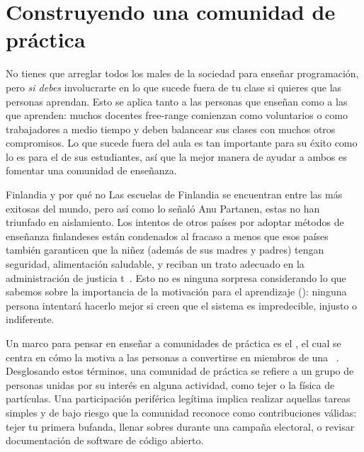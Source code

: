 \chapter{Construyendo una comunidad de práctica}\label{s:community}

No tienes que arreglar todos los males de la sociedad para enseñar programación,
pero \emph{si debes} involucrarte en
lo que sucede fuera de tu clase si quieres que las personas aprendan.
Esto se aplica tanto a las personas que enseñan como a las que aprenden:
muchos docentes free-range comienzan como voluntarios o como trabajadores a medio tiempo
y deben balancear  sus clases con muchos otros compromisos.
Lo que sucede fuera del aula es tan importante para su éxito
como lo es para el de sus estudiantes,
así que la mejor manera de ayudar a ambos es fomentar una comunidad de enseñanza.


\begin{aside}{Finlandia y por qué no}
Las escuelas de Finlandia se encuentran entre las más exitosas del mundo,
pero así como lo señaló Anu Partanen,
estas no han triunfado en aislamiento.
  Los intentos de otros países por adoptar métodos de enseñanza finlandeses están condenados al fracaso
  a menos que esos países también garanticen que la niñez (además de sus madres y padres) tengan seguridad, alimentación saludable,  y reciban un trato adecuado en la administración de justicia t~\cite{Sahl2015, Wilk2011}.
  Esto no es ninguna sorpresa considerando lo que sabemos sobre la importancia de la motivación para el aprendizaje ():
  ninguna persona intentará hacerlo mejor si creen que el sistema es impredecible, injusto o indiferente.
\end{aside}

Un marco para pensar en enseñar a comunidades de práctica  es el ,
el cual  se centra en cómo la  
motiva a las personas a convertirse en miembros de
una ~\cite{Weng2015}.
Desglosando estos términos,
una comunidad de práctica se refiere a  un grupo de personas unidas por su interés en alguna actividad,
como tejer o la física de partículas.
Una  participación periférica legítima implica realizar aquellas tareas simples y de bajo riesgo
que la comunidad reconoce como contribuciones válidas:
tejer tu primera bufanda,
llenar sobres durante una campaña electoral,
o revisar documentación de software de código abierto.

